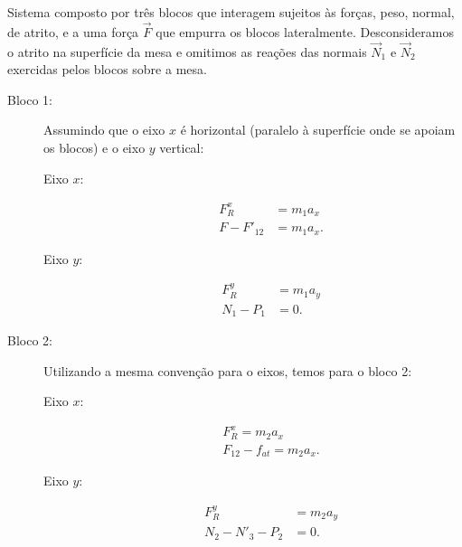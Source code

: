 \begin{marginfigure}[-5cm]
\caption{Sistema composto por três blocos que interagem sujeitos às forças, peso, normal, de atrito, e a uma força $\vec{F}$ que empurra os blocos lateralmente. Desconsideramos o atrito na superfície da mesa e omitimos as reações das normais $\vec{N}_1$ e $\vec{N}_2$ exercidas pelos blocos sobre a mesa.\label{Fig:BlocosForcasExternas}}
\end{marginfigure}
\begin{description}
    \item[Bloco 1:] Assumindo que o eixo $x$ é horizontal (paralelo à superfície onde se apoiam os blocos) e o eixo $y$ vertical:
        \begin{description}
            \item[Eixo $x$:]
                \begin{align}
                    F_R^x &= m_1 a_x \\
                    F - F'_{12} &= m_1 a_x.
                \end{align}
            \item[Eixo $y$:]
                \begin{align}
                    F_R^y &= m_1 a_y \\
                    N_1 - P_1 &= 0.
                \end{align}
        \end{description}
    \item[Bloco 2:] Utilizando a mesma convenção para o eixos, temos para o bloco 2:
        \begin{description}
            \item[Eixo $x$:]
                \begin{align}
                    F_R^x = m_2 a_x \\
                    F_{12} - f_{at} = m_2 a_x.
                \end{align}
            \item[Eixo $y$:]
                \begin{align}
                    F_R^y &= m_2 a_y \\
                    N_2 - N'_3 - P_2 &= 0.
                \end{align}
        \end{description}

\end{description}
